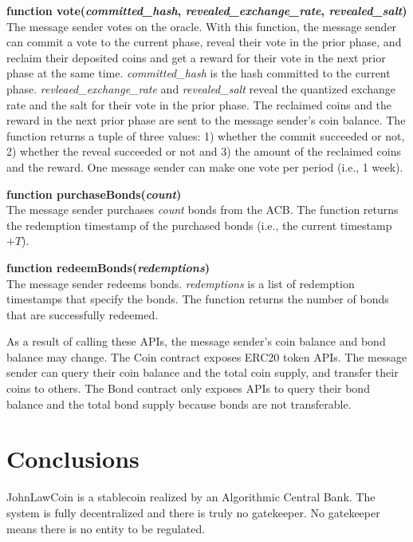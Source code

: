 \documentclass[dvipdfmx,a4paper]{article}
\begin{document}
\begin{description}
\item{\textbf{function vote(\textit{committed\_hash}, \textit{revealed\_exchange\_rate}, \textit{revealed\_salt})}}\\
The message sender votes on the oracle. With this function, the message sender can commit a vote to the current phase, reveal their vote in the prior phase, and reclaim their deposited coins and get a reward for their vote in the next prior phase at the same time. \textit{committed\_hash} is the hash committed to the current phase. \textit{revleaed\_exchange\_rate} and \textit{revealed\_salt} reveal the quantized exchange rate and the salt for their vote in the prior phase. The reclaimed coins and the reward in the next prior phase are sent to the message sender's coin balance. The function returns a tuple of three values: 1) whether the commit succeeded or not, 2) whether the reveal succeeded or not and 3) the amount of the reclaimed coins and the reward. One message sender can make one vote per period (i.e., 1 week).
\item{\textbf{function purchaseBonds(\textit{count})}}\\
The message sender purchases \textit{count} bonds from the ACB. The function returns the redemption timestamp of the purchased bonds (i.e., the current timestamp $+T$).
\item{\textbf{function redeemBonds(\textit{redemptions})}}\\
The message sender redeems bonds. \textit{redemptions} is a list of redemption timestamps that specify the bonds. The function returns the number of bonds that are successfully redeemed.
\end{description}

As a result of calling these APIs, the message sender's coin balance and bond balance may change. The Coin contract exposes ERC20 token APIs. The message sender can query their coin balance and the total coin supply, and transfer their coins to others. The Bond contract only exposes APIs to query their bond balance and the total bond supply because bonds are not transferable.

\section{Conclusions}

JohnLawCoin is a stablecoin realized by an Algorithmic Central Bank. The system is fully decentralized and there is truly no gatekeeper. No gatekeeper means there is no entity to be regulated.
\end{document}
